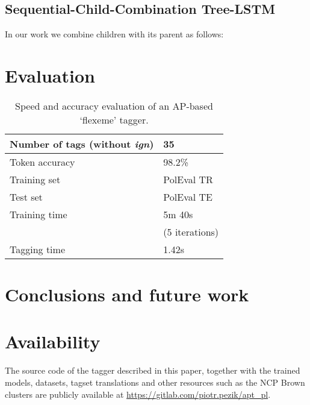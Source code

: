 \documentclass[10pt, a4paper]{article}
\begin{document}
\subsection{Sequential-Child-Combination Tree-LSTM}
	In our work we combine children with its parent as follows:
	
\section{Evaluation} 

\begin{table}[h]
 \begin{center}
\begin{tabular}{|l|l|}

      \hline
      Number of tags (without \textit{ign}) & 35\\
      \hline
      Token accuracy & 98.2\%\\
      \hline
      Training set & PolEval TR\\
      \hline
      Test set & PolEval TE\\
           \hline
      Training time & 5m 40s \\
      &(5 iterations)\\
      \hline
      Tagging time & 1.42s\\
 
      \hline
\end{tabular}
\caption{Speed and accuracy evaluation of an AP-based `flexeme' tagger.}
\label{tab:main_tags}
 \end{center}
\end{table}



\section{Conclusions and future work}


\section{Availability}

The source code of the tagger described in this paper, together with the trained models, datasets, tagset translations and other resources such as the NCP Brown clusters are publicly available at \url{https://gitlab.com/piotr.pezik/apt_pl}.



 
\end{document}
